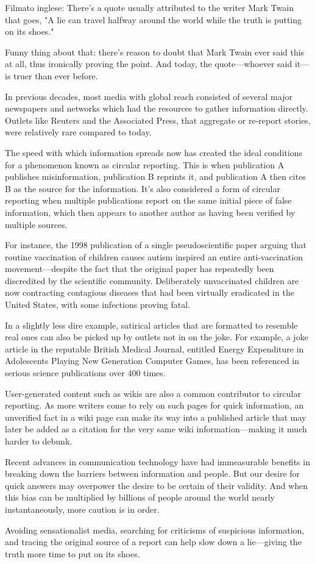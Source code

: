 \begin{itshape}Filmato inglese:
There's a quote usually attributed to the writer Mark Twain that goes, "A lie can travel halfway around the world while the truth is putting on its shoes."

Funny thing about that: there's reason to doubt that Mark Twain ever said this at all, thus ironically proving the point. And today, the quote—whoever said it—is truer than ever before.

In previous decades, most media with global reach consisted of several major newspapers and networks which had the resources to gather information directly. Outlets like Reuters and the Associated Press, that aggregate or re-report stories, were relatively rare compared to today.

The speed with which information spreads now has created the ideal conditions for a phenomenon known as circular reporting. This is when publication A publishes misinformation, publication B reprints it, and publication A then cites B as the source for the information. It's also considered a form of circular reporting when multiple publications report on the same initial piece of false information, which then appears to another author as having been verified by multiple sources.

For instance, the 1998 publication of a single pseudoscientific paper arguing that routine vaccination of children causes autism inspired an entire anti-vaccination movement—despite the fact that the original paper has repeatedly been discredited by the scientific community. Deliberately unvaccinated children are now contracting contagious diseases that had been virtually eradicated in the United States, with some infections proving fatal.

In a slightly less dire example, satirical articles that are formatted to resemble real ones can also be picked up by outlets not in on the joke. For example, a joke article in the reputable British Medical Journal, entitled Energy Expenditure in Adolescents Playing New Generation Computer Games, has been referenced in serious science publications over 400 times.

User-generated content such as wikis are also a common contributor to circular reporting. As more writers come to rely on such pages for quick information, an unverified fact in a wiki page can make its way into a published article that may later be added as a citation for the very same wiki information—making it much harder to debunk.

Recent advances in communication technology have had immeasurable benefits in breaking down the barriers between information and people. But our desire for quick answers may overpower the desire to be certain of their validity. And when this bias can be multiplied by billions of people around the world nearly instantaneously, more caution is in order.

Avoiding sensationalist media, searching for criticisms of suspicious information, and tracing the original source of a report can help slow down a lie—giving the truth more time to put on its shoes.
\end{itshape}\par

